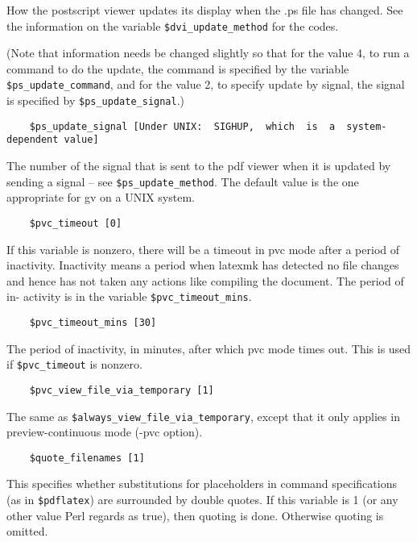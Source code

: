 How the postscript viewer updates its display when the .ps  file
has  changed.  See  the  information  on  the  variable \verb|$dvi_update_method| for the codes.

(Note  that  information  needs  be
changed slightly so that for the value 4, to run a command to do
the update, the command is specified  by  the  variable  \verb|$ps_update_command|,  
and for the value 2, to specify update by signal,
the signal is specified by \verb|$ps_update_signal|.)

\begin{verbatim}
	$ps_update_signal [Under UNIX:  SIGHUP,  which  is  a  system-dependent value]
\end{verbatim}

The  number of the signal that is sent to the pdf viewer when it
is updated by sending a signal --  see  \verb|$ps_update_method|.   The
default value is the one appropriate for gv on a UNIX system.

\begin{verbatim}
	$pvc_timeout [0]
\end{verbatim}

If  this  variable  is  nonzero, there will be a  timeout in pvc
mode after a period of inactivity.  Inactivity  means  a  period
when  latexmk  has  detected  no  file changes and hence has not
taken any actions like compiling the document. The period of in-
activity is in the variable \verb|$pvc_timeout_mins|.

\begin{verbatim}
	$pvc_timeout_mins [30]
\end{verbatim}

The period of inactivity, in minutes, after which pvc mode times
out.  This is used if \verb|$pvc_timeout| is nonzero.

\begin{verbatim}
	$pvc_view_file_via_temporary [1]
\end{verbatim}

The same as \verb|$always_view_file_via_temporary|, except that it only
applies in preview-continuous mode (-pvc option).

\begin{verbatim}
	$quote_filenames [1]
\end{verbatim}

This specifies whether substitutions for placeholders in command specifications
(as  in  \verb|$pdflatex|)  are  surrounded  by  double quotes.   If this
variable is 1 (or any other value Perl regards as true), then quoting is done.
Otherwise quoting is omitted.

